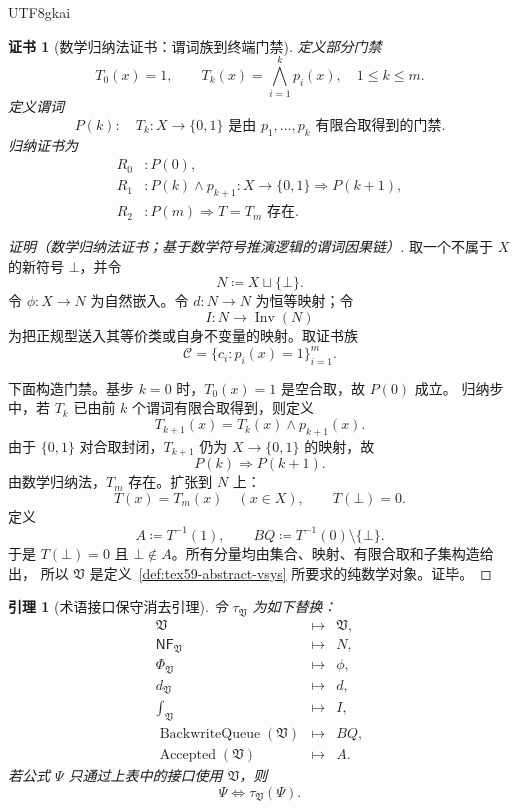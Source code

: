 \documentclass[12pt]{article}
\newtheorem{lemma}{引理}[section]
\newtheorem{Certificate}{证书}[section]
\newcommand{\Vsys}{\mathfrak V}
\newcommand{\NF}{\mathsf{NF}}
\newcommand{\DefEq}{\coloneqq}
\DeclareMathOperator{\Accepted}{Accepted}
\DeclareMathOperator{\Inv}{Inv}
\DeclareMathOperator{\BackwriteQueue}{BackwriteQueue}
\begin{document}
\begin{CJK*}{UTF8}{gkai}
\begin{Certificate}[数学归纳法证书：谓词族到终端门禁]
\label{cert:tex59-abstract-vsys-existence}
定义部分门禁
\[
  T_0(x)=1,
  \qquad
  T_k(x)=\bigwedge_{i=1}^{k}p_i(x),
  \quad 1\le k\le m.
\]
定义谓词
\[
  P(k):\quad
  T_k:X\to\{0,1\}\text{ 是由 }p_1,\ldots,p_k\text{ 有限合取得到的门禁}.
\]
归纳证书为
\[
\begin{aligned}
  R_0 &: P(0),\\
  R_1 &: P(k)\wedge p_{k+1}:X\to\{0,1\}
         \Rightarrow P(k+1),\\
  R_2 &: P(m)\Rightarrow T=T_m\text{ 存在}.
\end{aligned}
\]
\end{Certificate}

\begin{proof}[证明（数学归纳法证书；基于数学符号推演逻辑的谓词因果链）]
取一个不属于 \(X\) 的新符号 \(\bot\)，并令
\[
  N\DefEq X\sqcup\{\bot\}.
\]
令 \(\phi:X\to N\) 为自然嵌入。令 \(d:N\to N\) 为恒等映射；令
\[
  I:N\to \Inv(N)
\]
为把正规型送入其等价类或自身不变量的映射。取证书族
\[
  \mathcal C=\{c_i:p_i(x)=1\}_{i=1}^{m}.
\]

下面构造门禁。基步 \(k=0\) 时，\(T_0(x)=1\) 是空合取，故 \(P(0)\) 成立。
归纳步中，若 \(T_k\) 已由前 \(k\) 个谓词有限合取得到，则定义
\[
  T_{k+1}(x)=T_k(x)\wedge p_{k+1}(x).
\]
由于 \(\{0,1\}\) 对合取封闭，\(T_{k+1}\) 仍为 \(X\to\{0,1\}\) 的映射，故
\[
  P(k)\Rightarrow P(k+1).
\]
由数学归纳法，\(T_m\) 存在。扩张到 \(N\) 上：
\[
  T(x)=T_m(x)\quad(x\in X),
  \qquad
  T(\bot)=0.
\]
定义
\[
  A\DefEq T^{-1}(1),
  \qquad
  BQ\DefEq T^{-1}(0)\setminus\{\bot\}.
\]
于是 \(T(\bot)=0\) 且 \(\bot\notin A\)。所有分量均由集合、映射、有限合取和子集构造给出，
所以 \(\mathfrak V\) 是定义~\ref{def:tex59-abstract-vsys} 所要求的纯数学对象。证毕。
\end{proof}

\begin{lemma}[术语接口保守消去引理]
\label{lem:tex59-vsys-conservative-elimination}
令 \(\tau_{\mathfrak V}\) 为如下替换：
\[
\begin{array}{lll}
  \Vsys &\mapsto& \mathfrak V,\\
  \NF_{\Vsys} &\mapsto& N,\\
  \Phi_{\Vsys} &\mapsto& \phi,\\
  d_{\Vsys} &\mapsto& d,\\
  \int_{\Vsys} &\mapsto& I,\\
  \BackwriteQueue(\Vsys) &\mapsto& BQ,\\
  \Accepted(\Vsys) &\mapsto& A.
\end{array}
\]
若公式 \(\Psi\) 只通过上表中的接口使用 \(\Vsys\)，则
\[
  \Psi
  \Longleftrightarrow
  \tau_{\mathfrak V}(\Psi).
\]
\end{lemma}


\end{CJK*}
\end{document}
